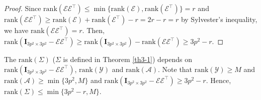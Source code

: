 \begin{proof} Since $\text{rank}(\mathcal{E}\mathcal{E}^{\top})\le\min\{\text{rank}(\mathcal{E}),\text{rank}(\mathcal{E}^{\top})\}=r$ and $\text{rank}(\mathcal{E}\mathcal{E}^{\top})\ge\text{rank}(\mathcal{E})+\text{rank}(\mathcal{E}^{\top})-r=2r-r=r$ by Sylvester's inequality, we have $\text{rank}(\mathcal{E}\mathcal{E}^{\top})=r$. Then, $\text{rank}(\bm{I}_{3p^2\times 3p^2}-\mathcal{E}\mathcal{E}^{\top})\ge\text{rank}(\bm{I}_{3p^2\times 3p^2})-\text{rank}(\mathcal{E}\mathcal{E}^{\top})\ge 3p^2-r$. 
\end{proof}

The $\text{rank}(\Sigma)$ ($\Sigma$ is defined in Theorem \ref{th3-1}) depends on $\text{rank}(\bm{I}_{3p^2\times 3p^2}-\mathcal{E}\mathcal{E}^{\top})$, $\text{rank}(\mathcal{Y})$ and $\text{rank}(\mathcal{A})$. Note that $\text{rank}(\mathcal{Y})\ge M$ and $\text{rank}(\mathcal{A})\ge \min\{3p^2,M\}$ and $\text{rank}(\bm{I}_{3p^2\times 3p^2}-\mathcal{E}\mathcal{E}^{\top})\ge 3p^2-r$. Hence, $\text{rank}(\Sigma)\le\min\{3p^2-r,M\}$.


